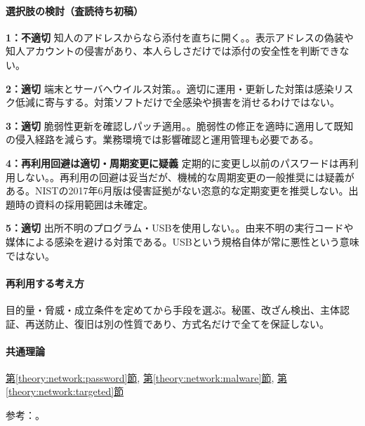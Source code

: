 \paragraph{選択肢の検討（査読待ち初稿）}\mbox{}\par

\noindent\textbf{1：不適切} 知人のアドレスからなら添付を直ちに開く。。表示アドレスの偽装や知人アカウントの侵害があり、本人らしさだけでは添付の安全性を判断できない。\par

\noindent\textbf{2：適切} 端末とサーバへウイルス対策。。適切に運用・更新した対策は感染リスク低減に寄与する。対策ソフトだけで全感染や損害を消せるわけではない。\par

\noindent\textbf{3：適切} 脆弱性更新を確認しパッチ適用。。脆弱性の修正を適時に適用して既知の侵入経路を減らす。業務環境では影響確認と運用管理も必要である。\par

\noindent\textbf{4：再利用回避は適切・周期変更に疑義} 定期的に変更し以前のパスワードは再利用しない。。再利用の回避は妥当だが、機械的な周期変更の一般推奨には疑義がある。NISTの2017年6月版は侵害証拠がない恣意的な定期変更を推奨しない。出題時の資料の採用範囲は未確定。\par

\noindent\textbf{5：適切} 出所不明のプログラム・USBを使用しない。。由来不明の実行コードや媒体による感染を避ける対策である。USBという規格自体が常に悪性という意味ではない。\par

\paragraph{再利用する考え方} 目的量・脅威・成立条件を定めてから手段を選ぶ。秘匿、改ざん検出、主体認証、再送防止、復旧は別の性質であり、方式名だけで全てを保証しない。

\paragraph{共通理論} \hyperref[theory:network:password]{第\ref*{theory:network:password}節}, \hyperref[theory:network:malware]{第\ref*{theory:network:malware}節}, \hyperref[theory:network:targeted]{第\ref*{theory:network:targeted}節}

\par 参考：\cite{net_nist2017,net_target2020,net_ipa_account}。

